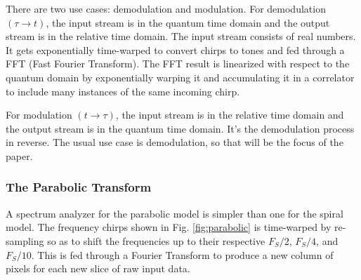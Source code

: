 There are two use cases: demodulation and modulation.
For demodulation $(\tau \rightarrow t)$, the input stream is in the quantum
time domain and the output stream is in the relative time domain.
The input stream consists of real numbers. It gets exponentially time-warped
to convert chirps to tones and fed through a FFT (Fast Fourier Transform).
The FFT result is linearized with respect to the quantum domain by exponentially
warping it and accumulating it in a correlator to
include many instances of the same incoming chirp.

For modulation $(t \rightarrow \tau)$, the input stream is in the relative time
domain and the output stream is in the quantum time domain.
It's the demodulation process in reverse.
The usual use case is demodulation, so that will be the focus of the paper.

\subsubsection{\label{sec:level1}The Parabolic Transform}

A spectrum analyzer for the parabolic model is simpler than one for the spiral model.
The frequency chirps shown in Fig. \ref{fig:parabolic} is time-warped by 
re-sampling so as to shift the frequencies up to their respective
$F_S/2$, $F_S/4$, and $F_S/10$. This is fed through a Fourier Transform to produce
a new column of pixels for each new slice of raw input data.

